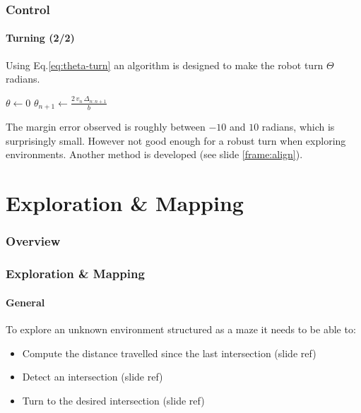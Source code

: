 \documentclass[10pt]{beamer}
\begin{document}

\begin{frame}
\frametitle{Control}
\framesubtitle{Turning (2/2)}
Using Eq.\ref{eq:theta-turn} an algorithm is designed to make the robot turn $\Theta$ radians.
\vspace*{8mm}
\begin{algorithmic}[1]
\State $\theta\gets 0$
\State {}
\While{$\theta < \Theta$}
\State $\theta_{n+1} \gets \frac{2\, v_n\, \Delta_{n:n+1}}{b}$
\EndWhile
\State {}
\EndProcedure
\end{algorithmic}
\vspace*{8mm}
The margin error observed is roughly between $-10$ and $10$ radians, which is surprisingly small. However not good enough for a robust turn when exploring environments. Another method is developed (see slide \ref{frame:align}).
\end{frame}


\section{Exploration \& Mapping} 

\begin{frame}
\frametitle{Overview}
\tableofcontents[currentsection,subsectionstyle=shaded]
\end{frame}

\begin{frame}
\frametitle{Exploration \& Mapping}
\framesubtitle{General}
To explore an unknown environment structured as a maze it needs to be able to:
\begin{itemize}
\item Compute the distance travelled since the last intersection (slide ref)
\item Detect an intersection (slide ref)
\item Turn to the desired intersection (slide ref)
\end{itemize}
\end{frame}

\end{document}
